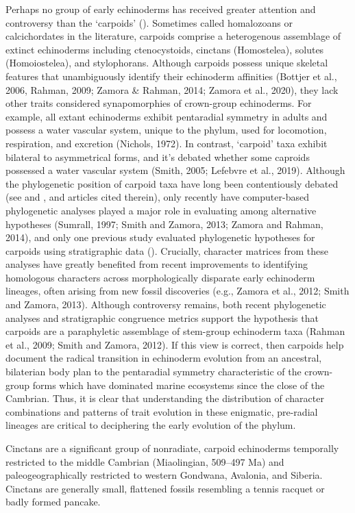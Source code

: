 \documentclass{article}
\begin{document}
Perhaps no group of early echinoderms has received greater attention and controversy than the `carpoids’ (\citep{Rahman2009b}). Sometimes called homalozoans or calcichordates in the literature, carpoids comprise a heterogenous assemblage of extinct echinoderms including ctenocystoids, cinctans (Homostelea), solutes (Homoiostelea), and stylophorans. Although carpoids possess unique skeletal features that unambiguously identify their echinoderm affinities (Bottjer et al., 2006, Rahman, 2009; Zamora & Rahman, 2014; Zamora et al., 2020), they lack other traits considered synapomorphies of crown-group echinoderms. For example, all extant echinoderms exhibit pentaradial symmetry in adults and possess a water vascular system, unique to the phylum, used for locomotion, respiration, and excretion (Nichols, 1972).  In contrast, ‘carpoid’ taxa exhibit bilateral to asymmetrical forms, and it’s debated whether some caproids possessed a water vascular system (Smith, 2005; Lefebvre et al., 2019). Although the phylogenetic position of carpoid taxa have long been contentiously debated (see \citep{Rahman2009c} and \citep{Rahman2009b}, and articles cited therein), only recently have computer-based phylogenetic analyses played a major role in evaluating among alternative hypotheses (Sumrall, 1997; Smith and Zamora, 2013; Zamora and Rahman, 2014), and only one previous study evaluated phylogenetic hypotheses for carpoids using stratigraphic data (\citep{Rahman2009b}). Crucially, character matrices from these analyses have greatly benefited from recent improvements to identifying homologous characters across morphologically disparate early echinoderm lineages, often arising from new fossil discoveries (e.g., Zamora et al., 2012; Smith and Zamora, 2013). Although controversy remains, both recent phylogenetic analyses and stratigraphic congruence metrics support the hypothesis that carpoids are a paraphyletic assemblage of stem-group echinoderm taxa (Rahman et al., 2009; Smith and Zamora, 2012). If this view is correct, then carpoids help document the radical transition in echinoderm evolution from an ancestral, bilaterian body plan to the pentaradial symmetry characteristic of the crown-group forms which have dominated marine ecosystems since the close of the Cambrian. Thus, it is clear that understanding the distribution of character combinations and patterns of trait evolution in these enigmatic, pre-radial lineages are critical to deciphering the early evolution of the phylum.

Cinctans are a significant group of nonradiate, carpoid echinoderms temporally restricted to the middle Cambrian (Miaolingian, 509--497 Ma) and paleogeographically restricted to western Gondwana, Avalonia, and Siberia. Cinctans are generally small, flattened fossils resembling a tennis racquet or badly formed pancake.
\end{document}
